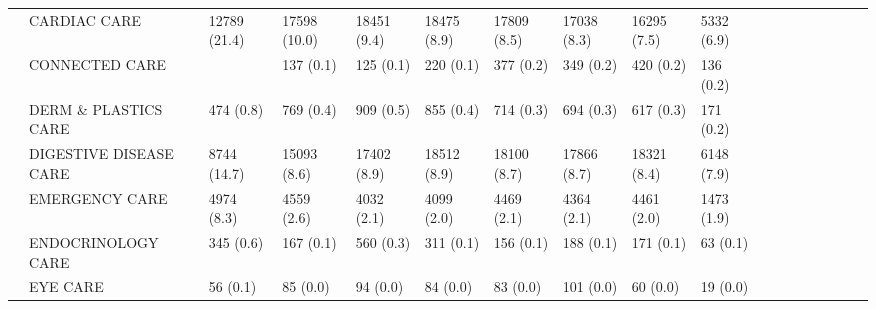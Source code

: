 \begin{tabular}{llllllllllllllllll}
                                       & CARDIAC CARE &                 12789 (21.4) &    17598 (10.0) &     18451 (9.4) &     18475 (8.9) &     17809 (8.5) &     17038 (8.3) &     16295 (7.5) &     5332 (6.9) &                   &                    &                    &                    &                    &                     &                     &                     \\
                                       & CONNECTED CARE &                              &       137 (0.1) &       125 (0.1) &       220 (0.1) &       377 (0.2) &       349 (0.2) &       420 (0.2) &      136 (0.2) &                   &                    &                    &                    &                    &                     &                     &                     \\
                                       & DERM \& PLASTICS CARE &                    474 (0.8) &       769 (0.4) &       909 (0.5) &       855 (0.4) &       714 (0.3) &       694 (0.3) &       617 (0.3) &      171 (0.2) &                   &                    &                    &                    &                    &                     &                     &                     \\
                                       & DIGESTIVE DISEASE CARE &                  8744 (14.7) &     15093 (8.6) &     17402 (8.9) &     18512 (8.9) &     18100 (8.7) &     17866 (8.7) &     18321 (8.4) &     6148 (7.9) &                   &                    &                    &                    &                    &                     &                     &                     \\
                                       & EMERGENCY CARE &                   4974 (8.3) &      4559 (2.6) &      4032 (2.1) &      4099 (2.0) &      4469 (2.1) &      4364 (2.1) &      4461 (2.0) &     1473 (1.9) &                   &                    &                    &                    &                    &                     &                     &                     \\
                                       & ENDOCRINOLOGY CARE &                    345 (0.6) &       167 (0.1) &       560 (0.3) &       311 (0.1) &       156 (0.1) &       188 (0.1) &       171 (0.1) &       63 (0.1) &                   &                    &                    &                    &                    &                     &                     &                     \\
                                       & EYE CARE &                     56 (0.1) &        85 (0.0) &        94 (0.0) &        84 (0.0) &        83 (0.0) &       101 (0.0) &        60 (0.0) &       19 (0.0) &                   &                    &                    &                    &                    &                     &                     &                     \\

\end{tabular}

